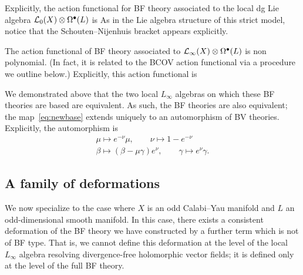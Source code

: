 \documentclass[11pt]{amsart}
\begin{document}
Explicitly, the action functional for BF theory associated to the local dg Lie algebra $\mathcal L_0(X) \otimes \Omega^{\bullet}(L)$ is
As in the Lie algebra structure of this strict model, notice that the Schouten--Nijenhuis bracket appears explicitly. 

The action functional of BF theory associated to $\mathcal L_\infty(X) \otimes \Omega^{\bullet}(L)$ is non polynomial.
(In fact, it is related to the BCOV action functional via a procedure we outline below.) 
Explicitly, this action functional is

We demonstrated above that the two local $L_\infty$ algebras on which these BF theories are based are equivalent. As such, the BF theories are also equivalent; the map~\eqref{eq:newbase} extends uniquely to an automorphism of BV theories.
Explicitly, the automorphism is
\begin{multline}
  \mu \mapsto e^{-\nu} \mu, \qquad \nu \mapsto 1-e^{-\nu} \\
  \beta \mapsto (\beta - \mu \gamma) e^{\nu},\qquad \gamma \mapsto e^{\nu} \gamma .
\end{multline}
\subsection{A family of deformations} 

\parsec
We now specialize to the case where $X$ is an odd Calabi--Yau manifold and $L$ an odd-dimensional smooth manifold. 
In this case, there exists a consistent deformation of the BF theory we have constructed by a further term which is not of BF type. That is, we cannot define this deformation at the level of the local $L_\infty$ algebra resolving divergence-free holomorphic vector fields; it is defined only at the level of the full BF theory.
\end{document}
